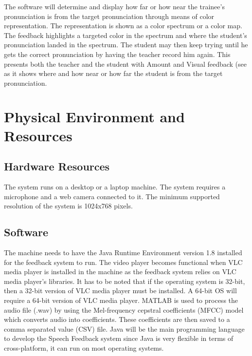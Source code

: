 The software will determine and display how far or how near the trainee's pronunciation is from the target pronunciation through means of color representation. The representation is shown as a color spectrum or a color map. The feedback highlights a targeted color in the spectrum and where the student's pronunciation landed in the spectrum. The student may then keep trying until he gets the correct pronunciation by having the teacher record him again. This presents both the teacher and the student with Amount and Visual feedback (see  as it shows where and how near or how far the student is from the target pronunciation.

\section{Physical Environment and Resources}

\subsection{Hardware Resources}
The system runs on a desktop or a laptop machine. The system requires a microphone and a web camera connected to it. The minimum supported resolution of the system is 1024x768 pixels.

\subsection{Software}
The machine needs to have the Java Runtime Environment version 1.8 installed for the feedback system to run.
The video player becomes functional when VLC media player is installed in the machine as the feedback system relies on VLC media player's libraries. It has to be noted that if the operating system is 32-bit, then a 32-bit version of VLC media player must be installed. A 64-bit OS will require a 64-bit version of VLC media player.
MATLAB is used to process the audio file (.wav) by using the Mel-frequency cepstral coefficients (MFCC) model which converts audio into coefficients. These coefficients are then saved to a comma separated value (CSV) file.
Java will be the main programming language to develop the Speech Feedback system since Java is very flexible in terms of cross-platform, it can run on most operating systems.

